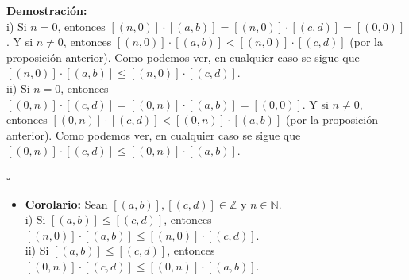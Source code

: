 \documentclass[10 pt]{article}
\begin{document}
\Large{\textbf{Demostración:} \\

i) Si $n=0$, entonces $[(n,0)] \cdot [(a,b)]=[(n,0)] \cdot [(c,d)]=[(0,0)]$. Y si $n \neq 0$, entonces $[(n,0)] \cdot [(a,b)]<[(n,0)] \cdot [(c,d)]$ (por la proposición anterior). Como podemos ver, en cualquier caso se sigue que $[(n,0)] \cdot [(a,b)] \leq [(n,0)] \cdot [(c,d)]$. \\

ii) Si $n=0$, entonces $[(0,n)] \cdot [(c,d)]=[(0,n)] \cdot [(a,b)]=[(0,0)]$. Y si $n \neq 0$, entonces $[(0,n)] \cdot [(c,d)]<[(0,n)] \cdot [(a,b)]$ (por la proposición anterior). Como podemos ver, en cualquier caso se sigue que $[(0,n)] \cdot [(c,d)] \leq [(0,n)] \cdot [(a,b)]$.} \\

\begin{flushright}
    $\square$
\end{flushright}

\begin{itemize}
    \item \Large{\textbf{Corolario:} Sean $[(a,b)],[(c,d)] \in \mathbb Z$ y $n \in \mathbb N$. \\

    i) Si $[(a,b)] \leq [(c,d)]$, entonces $[(n,0)] \cdot [(a,b)] \leq [(n,0)] \cdot [(c,d)]$. \\

    ii) Si $[(a,b)] \leq [(c,d)]$, entonces $[(0,n)] \cdot [(c,d)] \leq [(0,n)] \cdot [(a,b)]$.} \\
\end{itemize}
\end{document}
